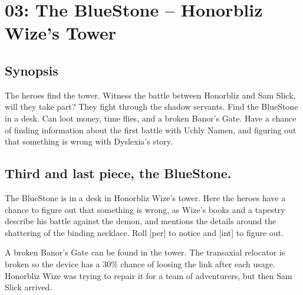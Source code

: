 

\clearpage
{}
\section*{03: The BlueStone -- Honorbliz Wize's Tower}


\subsection*{Synopsis}
The heroes find the tower. Witness the battle between Honorbliz and Sam Slick, will they take part? They fight through the shadow servants. Find the BlueStone in a desk. Can loot money, time flies, and a broken Banor's Gate. Have a chance of finding information about the first battle with Uchly Namen, and figuring out that something is wrong with Dyslexia's story.


\subsection*{Third and last piece, the BlueStone.}
The BlueStone is in a desk in Honorbliz Wize's tower.
Here the heroes have a chance to figure out that something is wrong, as Wize's books and a tapestry describe his battle against the demon, and mentions the details around the shattering of the binding necklace.
Roll [per] to notice and [int] to figure out.

A broken Banor's Gate can be found in the tower. The transaxial relocator is broken so the device has a 30\% chance of loosing the link after each usage. Honorbliz Wize was trying to repair it for a team of adventurers, but then Sam Slick arrived.


